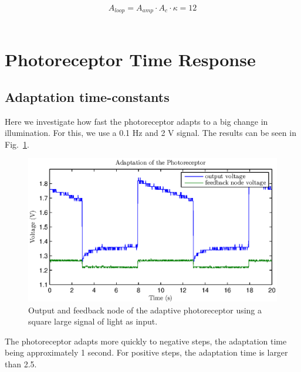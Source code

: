 \begin{equation*}
A_{loop}=A_{amp} \cdot A_c \cdot \kappa = 12
\end{equation*}
	\\
\section{Photoreceptor Time Response}
\subsection{Adaptation time-constants}
Here we investigate how fast the photoreceptor adapts to a big change in illumination. For this, we use a 0.1 Hz and 2 V signal. The results can be seen in  Fig.~\ref{fig:exp2.1}.

\begin{figure}[H]
	\center
	\includegraphics{exp2_1.eps}
	\caption{Output and feedback node of the adaptive photoreceptor using a square large signal of light as input.}
	\label{fig:exp2.1}
\end{figure}

The photoreceptor adapts more quickly to negative steps, the adaptation time being approximately 1 second. For positive steps, the adaptation time is larger than 2.5.\\ 

